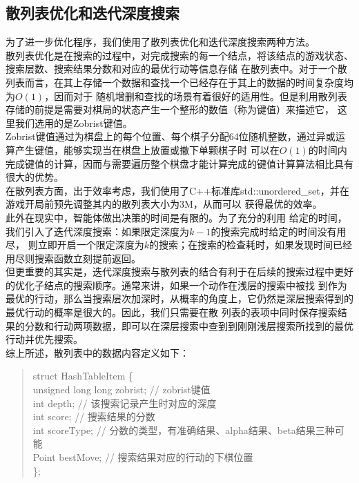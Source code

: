 \documentclass{acm_proc_article-sp}
\begin{document}
\subsection{\textbf{散列表优化和迭代深度搜索}}
为了进一步优化程序，我们使用了散列表优化和迭代深度搜索两种方法。\\
散列表优化是在搜索的过程中，对完成搜索的每一个结点，将该结点的游戏状态、搜索层数、搜索结果分数和对应的最优行动等信息存储
在散列表中。对于一个散列表而言，在其上存储一个数据和查找一个已经存在于其上的数据的时间复杂度均为$O(1)$，因而对于
随机增删和查找的场景有着很好的适用性。但是利用散列表存储的前提是需要对棋局的状态产生一个整形的数值（称为键值）来描述它，
这里我们选用的是Zobrist键值。\\
Zobrist键值通过为棋盘上的每个位置、每个棋子分配64位随机整数，通过异或运算产生键值，能够实现当在棋盘上放置或撤下单颗棋子时
可以在$O(1)$的时间内完成键值的计算，因而与需要遍历整个棋盘才能计算完成的键值计算算法相比具有很大的优势。\\
在散列表方面，出于效率考虑，我们使用了C++标准库std::unordered\_set，并在游戏开局前预先调整其内的散列表大小为3M，从而可以
获得最优的效率。\\
此外在现实中，智能体做出决策的时间是有限的。为了充分的利用
给定的时间，我们引入了迭代深度搜索：如果限定深度为$k-1$的搜索完成时给定的时间没有用尽，
则立即开启一个限定深度为$k$的搜索；在搜索的检查耗时，如果发现时间已经用尽则搜索函数立刻提前返回。\\
但更重要的其实是，迭代深度搜索与散列表的结合有利于在后续的搜索过程中更好的优化子结点的搜索顺序。通常来讲，如果一个动作在浅层的搜索中被找
到作为最优的行动，那么当搜索层次加深时，从概率的角度上，它仍然是深层搜索得到的最优行动的概率是很大的。因此，我们只需要在散
列表的表项中同时保存搜索结果的分数和行动两项数据，即可以在深层搜索中查到到刚刚浅层搜索所找到的最优行动并优先搜索。\\
综上所述，散列表中的数据内容定义如下：
\begin{quote}
       struct HashTableItem \{\\
              \hspace*{0.6cm} unsigned long long zobrist; // zobrist键值 \\
              \hspace*{0.6cm} int depth; // 该搜索记录产生时对应的深度 \\
              \hspace*{0.6cm} int score; // 搜索结果的分数 \\
              \hspace*{0.6cm} int scoreType; // 分数的类型，有准确结果、alpha结果、beta结果三种可能 \\
              \hspace*{0.6cm} Point bestMove; // 搜索结果对应的行动的下棋位置 \\
       \};
\end{quote}
\end{document}
